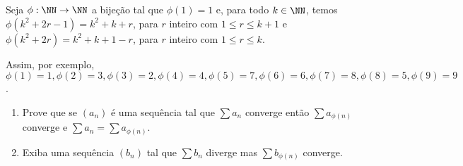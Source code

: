 Seja $\phi: \NN \to \NN$ a bijeção tal que $\phi(1) = 1$ e, para todo $k \in \NN$, temos $\phi(k^2 + 2r - 1) = k^2 + k + r$, para $r$ inteiro com $1 \le r \le k+1$ e $\phi(k^2 + 2r) = k^2 + k + 1 - r$, para $r$ inteiro com $1 \le r \le k$.

Assim, por exemplo, $\phi(1) = 1, \phi(2) = 3, \phi(3) = 2, \phi(4) = 4, \phi(5) = 7, \phi(6) = 6, \phi(7) = 8, \phi(8) = 5, \phi(9) = 9$.

\begin{enumerate}[label = (\alph*)]
	\item Prove que se $(a_n)$ é uma sequência tal que $\sum a_n$ converge então $\sum a_{\phi(n)}$ converge e $\sum a_n = \sum a_{\phi(n)}$.
	\item Exiba uma sequência $(b_n)$ tal que $\sum b_n$ diverge mas $\sum b_{\phi(n)}$ converge.
\end{enumerate}
